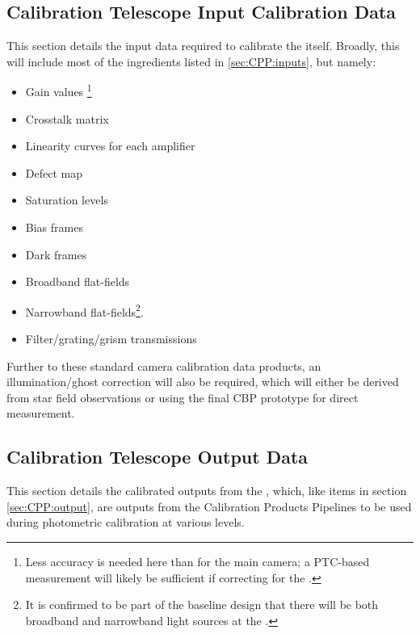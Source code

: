

\subsection{Calibration Telescope Input Calibration Data}
\label{sec:CPP:auxTelescope:inputs}
This section details the input data required to calibrate the \auxtelescope itself. Broadly, this will include most of the ingredients listed in \secsymbol\ref{sec:CPP:inputs}, but namely:

\begin{itemize}
	\item Gain values \footnote{Less accuracy is needed here than for the main camera; a PTC-based measurement will likely be sufficient if correcting for the \bfeffect.}
	\item Crosstalk matrix
	\item Linearity curves for each amplifier
	\item Defect map
	\item Saturation levels
	\item Bias frames
	\item Dark frames
	\item Broadband flat-fields
	\item Narrowband flat-fields\footnote{ It is confirmed to be part of the baseline design that there will be both broadband and narrowband light sources at the \auxtelescope.}.
	\item Filter/grating/grism transmissions
\end{itemize}

Further to these standard camera calibration data products, an illumination/ghost correction will also be required, which will either be derived from star field observations or using the final CBP prototype for direct measurement.







\subsection{Calibration Telescope Output Data}
\label{sec:CPP:auxTelescope:outputs}
This section details the calibrated outputs from the \auxtelescope, which, like items in section \secsymbol\ref{sec:CPP:output}, are outputs from the Calibration Products Pipelines to be used during photometric calibration at various levels.


